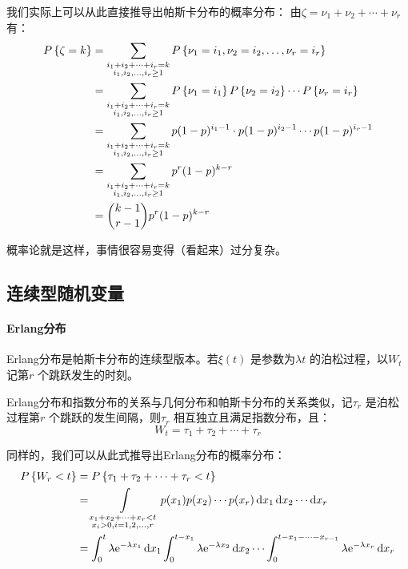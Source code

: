 我们实际上可以从此直接推导出帕斯卡分布的概率分布：
由\(\zeta = \nu_{1} + \nu_{2} + \cdots + \nu_{r}\) 有：
\begin{align*}
    \P{\zeta=k} &=
    \sum_{\substack{i_{1}+i_{2}+\dots +i_{r}=k
    \\ i_{1},i_{2},\ldots,i_{r}\geq 1}} \P{\nu_{1}=i_{1},
    \nu_{2}=i_{2}, \ldots, \nu_{r}=i_{r}} \\
    &=\sum_{\substack{i_{1}+i_{2}+\dots +i_{r}=k
    \\ i_{1},i_{2},\ldots,i_{r}\geq 1}} P\left\{
    \nu_{1}=i_{1}\right\} \P{ \nu_{2}=i_{2} }
    \cdots \P{ \nu_{r}=i_{r} } \\
    &= \sum_{\substack{i_{1}+i_{2}+\dots +i_{r}=k
    \\ i_{1},i_{2},\ldots,i_{r}\geq 1}} p(1-p)^{i_{1}-1}
    \cdot p(1-p)^{i_{2}-1} \cdots p(1-p)^{i_{r}-1} \\
    &= \sum_{\substack{i_{1}+i_{2}+\dots +i_{r}=k
    \\ i_{1},i_{2},\ldots,i_{r}\geq 1}} p^{r} (1-p)^{k-r} \\
    &= \binom{k-1}{r-1} p^{r} (1-p)^{k-r}
\end{align*}

概率论就是这样，事情很容易变得（看起来）过分复杂。

\subsection{连续型随机变量}

\paragraph{Erlang分布} Erlang分布是帕斯卡分布的连续型版本。若\(\xi(t)\)
是参数为\(\lambda t\) 的泊松过程，以\(W_{t}\) 记第\(r\) 个跳跃发生的时刻。

Erlang分布和指数分布的关系与几何分布和帕斯卡分布的关系类似，记\(\tau_{r}\) 是泊松过程第\(r\)
个跳跃的发生间隔，则\(\tau_{r}\) 相互独立且满足指数分布，且：
\[
    W_{t} = \tau_{1} + \tau_{2} + \cdots + \tau_{r}
\]

同样的，我们可以从此式推导出Erlang分布的概率分布：
\begin{align*}
    \P{W_{r}<t} &= \P{\tau_{1}+\tau_{2}+\cdots+\tau_{r}<t} \\
    &= \int\limits_{\substack{x_{1}+x_{2}+\dots +x_{r}<t
    \\ x_{i}>0, i=1,2,\ldots,r}} p(x_{1}) p(x_{2}) \cdots p(x_{r})
    \d{x}_{1} \d{x}_{2} \cdots \d{x}_{r} \\
    &=\int_{0}^{t} \lambda \e^{-\lambda x_{1}} \d{x_{1}}
    \int_{0}^{t-x_{1}} \lambda \e^{-\lambda x_{2}} \d{x_{2}} \cdots
    \int_{0}^{t-x_{1}-\cdots-x_{r-1}} \lambda \e^{-\lambda
    x_{r}} \d{x_{r}} \\
\end{align*}

